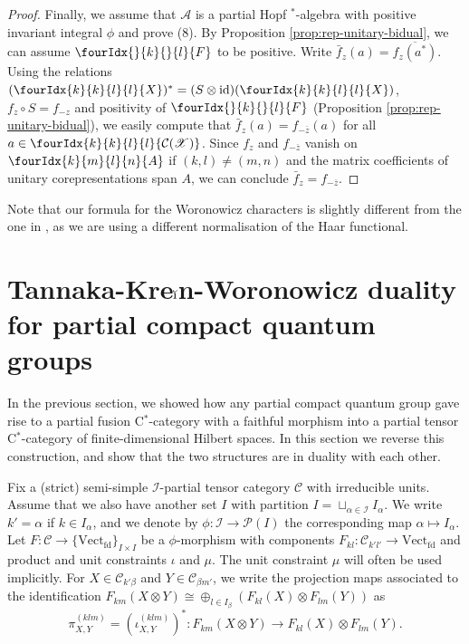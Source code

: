 \documentclass[10pt]{article}
\DeclareMathOperator{\fin}{\mathrm{fd}}
\DeclareMathOperator{\id}{id}
\newcommand{\CatC}{\mathcal{C}}
\newcommand{\CatCC}{\mathscr{C}}
\newcommand{\Vect}{\mathrm{Vect}}
\newcommand{\Gr}[5]{\fourIdx{#2}{#4}{#3}{#5}{#1}}%
\newcommand{\Gru}[3]{\Gr{#1}{}{}{#2}{#3}}
\theoremstyle{definition}
\numberwithin{equation}{section}
\begin{document}
\begin{proof}
     Finally, we assume that $\mathscr{A}$ is a partial Hopf
     $^*$-algebra with positive invariant integral $\phi$ and prove
     (8).  By Proposition \ref{prop:rep-unitary-bidual}, we can assume
     $\Gru{F}{k}{l}$ to be positive.  Write
     $\bar{f}_z(a) = \overline{f_z(a^*)}$. Using the relations $
     (\Gr{X}{k}{l}{k}{l})^{*}=(S \otimes \id)(\Gr{X}{k}{l}{k}{l})$,
     $f_{z} \circ S=f_{-z}$  and
     positivity of $\Gr{F}{}{}{k}{l}$ (Proposition
     \ref{prop:rep-unitary-bidual}), we easily compute that $\bar{f}_z(a) = f_{-\overline{z}}(a)$ for all $a\in
\Gr{\mathcal{C}(\mathscr{X})}{k}{l}{k}{l}$. Since $f_{z}$ and
$f_{-\overline{z}}$ vanish on $\Gr{A}{k}{l}{m}{n}$ if $(k,l)\neq
(m,n)$ and the matrix coefficients of unitary 
corepresentations span $A$, we can conclude $\bar{f}_{z}=f_{-\overline{z}}$.
\end{proof}

Note that our formula for the Woronowicz characters is slightly different from the one in \cite{Hay1}, as we are using a different normalisation of the Haar functional.


\section{Tannaka-Kre$\breve{\textrm{\i}}$n-Woronowicz duality for partial compact quantum groups}

In the previous section, we showed how any partial compact quantum group gave rise to a partial fusion C$^*$-category with a faithful morphism into a partial tensor C$^*$-category of finite-dimensional Hilbert spaces. In this section we reverse this construction, and show that the two structures are in duality with each other. 

Fix a (strict) semi-simple $\mathscr{I}$-partial tensor category $\CatCC$ with irreducible units. Assume that we also have another set $I$ with partition $I = \sqcup_{\alpha\in \mathscr{I}} I_{\alpha}$. We write $k' = \alpha$ if $k\in I_{\alpha}$, and we denote by $\phi: \mathscr{I}\rightarrow \mathscr{P}(I)$ the corresponding map $\alpha \mapsto I_{\alpha}$.  Let $F: \CatCC\rightarrow \{\Vect_{\fin}\}_{I\times I}$ be a $\phi$-morphism with components $F_{kl}:\CatCC_{k'l'}\rightarrow \Vect_{\fin}$ and product and unit constraints $\iota$ and $\mu$. The unit constraint $\mu$ will often be used implicitly. For $X\in \CatC_{k'\beta}$ and $Y\in \CatC_{\beta m'}$, we write the projection maps associated to the identification $F_{km}(X\otimes Y)\cong \oplus_{l\in I_\beta} \left(F_{kl}(X)\otimes F_{lm}(Y)\right)$ as \[\pi^{(klm)}_{X,Y}=(\iota^{(klm)}_{X,Y})^{*}:F_{km}(X\otimes Y) \rightarrow F_{kl}(X)\otimes F_{lm}(Y).\]
\end{document}
